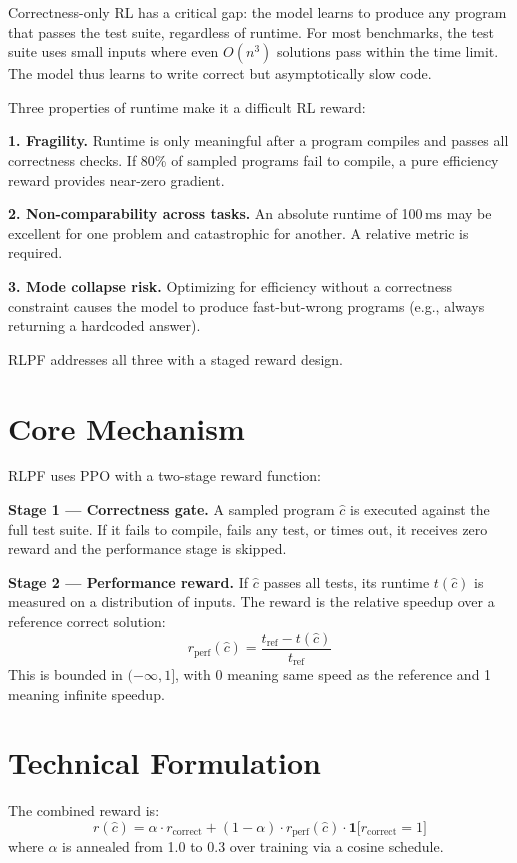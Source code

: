 \documentclass[10pt,twocolumn]{article}
\begin{document}
Correctness-only RL has a critical gap: the model learns to produce any
program that passes the test suite, regardless of runtime. For most
benchmarks, the test suite uses small inputs where even $O(n^3)$
solutions pass within the time limit. The model thus learns to write
correct but asymptotically slow code.

Three properties of runtime make it a difficult RL reward:

\textbf{1. Fragility.} Runtime is only meaningful after a program compiles
and passes all correctness checks. If 80\% of sampled programs fail to
compile, a pure efficiency reward provides near-zero gradient.

\textbf{2. Non-comparability across tasks.} An absolute runtime of
100\,ms may be excellent for one problem and catastrophic for another.
A relative metric is required.

\textbf{3. Mode collapse risk.} Optimizing for efficiency without a
correctness constraint causes the model to produce fast-but-wrong programs
(e.g., always returning a hardcoded answer).

RLPF addresses all three with a staged reward design.

\section{Core Mechanism}

RLPF uses PPO with a two-stage reward function:

\textbf{Stage 1 --- Correctness gate.} A sampled program $\hat{c}$ is
executed against the full test suite. If it fails to compile, fails any
test, or times out, it receives zero reward and the performance stage is
skipped.

\textbf{Stage 2 --- Performance reward.} If $\hat{c}$ passes all tests,
its runtime $t(\hat{c})$ is measured on a distribution of inputs. The
reward is the relative speedup over a reference correct solution:
\[
  r_{\text{perf}}(\hat{c}) = \frac{t_{\text{ref}} - t(\hat{c})}{t_{\text{ref}}}
\]
This is bounded in $(-\infty, 1]$, with 0 meaning same speed as the
reference and 1 meaning infinite speedup.

\section{Technical Formulation}

The combined reward is:
\[
  r(\hat{c}) = \alpha \cdot r_{\text{correct}} +
  (1 - \alpha) \cdot r_{\text{perf}}(\hat{c}) \cdot
  \mathbf{1}\bigl[r_{\text{correct}} = 1\bigr]
\]
where $\alpha$ is annealed from 1.0 to 0.3 over training via a cosine
schedule.
\end{document}
